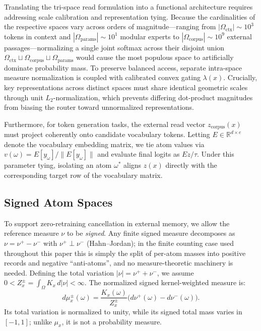 \documentclass[preprint,12pt]{elsarticle}
\newcommand{\R}{\mathbb{R}}
\newcommand{\Om}{\Omega}
\begin{document}
Translating the tri-space read formulation into a functional architecture requires addressing scale calibration and representation tying. Because the cardinalities of the respective spaces vary across orders of magnitude---ranging from $|\Om_{\mathrm{ctx}}| \sim 10^3$ tokens in context and $|\Om_{\mathrm{params}}| \sim 10^1$ modular experts to $|\Om_{\mathrm{corpus}}| \sim 10^9$ external passages---normalizing a single joint softmax across their disjoint union $\Om_{\mathrm{ctx}} \sqcup \Om_{\mathrm{corpus}} \sqcup \Om_{\mathrm{params}}$ would cause the most populous space to artificially dominate probability mass. To preserve balanced access, separate intra-space measure normalization is coupled with calibrated convex gating $\lambda(x)$. Crucially, key representations across distinct spaces must share identical geometric scales through unit $L_2$-normalization, which prevents differing dot-product magnitudes from biasing the router toward unnormalized representations.

Furthermore, for token generation tasks, the external read vector $z_{\mathrm{corpus}}(x)$ must project coherently onto candidate vocabulary tokens. Letting $E \in \R^{d \times e}$ denote the vocabulary embedding matrix, we tie atom values via $v(\omega) = E[y_\omega] / \|E[y_\omega]\|$ and evaluate final logits as $Ez / \tau$. Under this parameter tying, isolating an atom $\omega^*$ aligns $z(x)$ directly with the corresponding target row of the vocabulary matrix.

\subsection{Signed Atom Spaces}
\label{sec:signed_spaces}

To support zero-retraining cancellation in external memory, we allow the reference measure $\nu$ to be \emph{signed}. Any finite signed measure decomposes as $\nu = \nu^+ - \nu^-$ with $\nu^+ \perp \nu^-$ (Hahn--Jordan); in the finite counting case used throughout this paper this is simply the split of per-atom masses into positive records and negative ``anti-atoms'', and no measure-theoretic machinery is needed. Defining the total variation $|\nu| = \nu^+ + \nu^-$, we assume $0 < Z_x^{\pm} = \int_\Om K_x\,d|\nu| < \infty$. The normalized signed kernel-weighted measure is:
\[
  d\mu_x^{\pm}(\omega) = \frac{K_x(\omega)}{Z_x^{\pm}}\big(d\nu^+(\omega)-d\nu^-(\omega)\big).
\]
Its total variation is normalized to unity, while its signed total mass varies in $[-1, 1]$; unlike $\mu_x$, it is not a probability measure.
\end{document}
